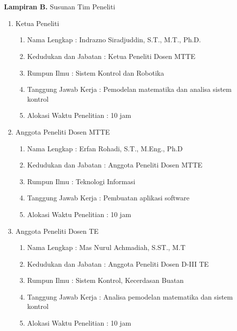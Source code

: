 \chapter*{}
\vskip 7.5cm
\centering
\Large \textbf{Lampiran B.} Susunan Tim Peneliti
\newpage
\begin{enumerate}
	\normalsize
	\item Ketua Peneliti
	\begin{enumerate}
		\item Nama Lengkap : Indrazno Siradjuddin, S.T., M.T., Ph.D.
		\item Kedudukan dan Jabatan : Ketua Peneliti Dosen MTTE
		\item Rumpun Ilmu : Sistem Kontrol dan Robotika
		\item Tanggung Jawab Kerja : Pemodelan matematika dan analisa sistem kontrol
		\item Alokasi Waktu Penelitian : 10 jam 
	\end{enumerate}
	\item Anggota Peneliti Dosen MTTE
	\begin{enumerate}
		\item Nama Lengkap : Erfan Rohadi, S.T., M.Eng., Ph.D
		\item Kedudukan dan Jabatan : Anggota Peneliti Dosen MTTE
		\item Rumpun Ilmu : Teknologi Informasi
		\item Tanggung Jawab Kerja : Pembuatan aplikasi software 
		\item Alokasi Waktu Penelitian : 10 jam 
	\end{enumerate}
	\item Anggota Peneliti Dosen TE
	\begin{enumerate}
		\item Nama Lengkap : Mas Nurul Achmadiah, S.ST., M.T
		\item Kedudukan dan Jabatan : Anggota Peneliti Dosen D-III TE
		\item Rumpun Ilmu : Sistem Kontrol, Kecerdasan Buatan
		\item Tanggung Jawab Kerja : Analisa pemodelan matematika dan sistem kontrol 
		\item Alokasi Waktu Penelitian : 10 jam 
	\end{enumerate}


\end{enumerate}
